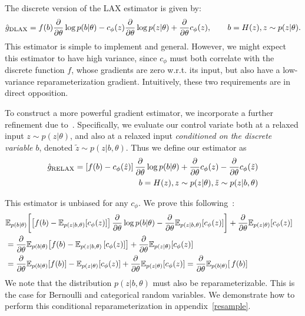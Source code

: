 \documentclass{article}
\newcommand{\discreteDist}{p(b|\theta)}
\newcommand{\loss}{f(b)}
\newcommand{\expectedLoss}{\mathbb{E}_{\discreteDist{}} \! \left[ \, \loss{} \right]}
\newcommand{\E}{\mathbb{E}}
\newcommand{\PT}{\frac{\partial}{\partial \theta}}
\newcommand{\LAX}{{\textnormal{LAX}}}
\newcommand{\DLAX}{{\textnormal{DLAX}}}
\begin{document}
The discrete version of the \LAX{} estimator is given by:
%
\begin{align}
\label{eq:discrete lax}
\hat g_\DLAX = f(b) \PT \log p(b|\theta) - c_\phi(z) \PT \log p(z|\theta) + \PT c_\phi(z), \qquad b = H(z), z \sim p(z|\theta).
\end{align}
%
This estimator is simple to implement and general.
However, we might expect this estimator to have high variance, since $c_\phi$ must both correlate with the discrete function $f$, whose gradients are zero w.r.t. its input, but also have a low-variance reparameterization gradient.
Intuitively, these two requirements are in direct opposition.

To construct a more powerful gradient estimator, we incorporate a further refinement due to~\cite{tucker2017rebar}.
Specifically, we evaluate our control variate both at a relaxed input $z \sim p(z|\theta)$, and also at a relaxed input \emph{conditioned on the discrete variable $b$}, denoted $\tilde z \sim p(z|b, \theta)$. 
Thus we define our estimator as
%
\begin{align}
\hat g_\textnormal{RELAX} = \left[ f(b) - c_\phi(\hat{z}) \right] \PT \log p(b|\theta) + \PT c_\phi(z) - \PT c_\phi (\tilde{z}) \\
\qquad b = H(z), z \sim p(z|\theta), \tilde{z} \sim p(z|b, \theta) \nonumber
\end{align}
%

This estimator is unbiased for any $c_\phi$.
We prove this following~\cite{tucker2017rebar}:
%
\begin{align}
\E_{p(b|\theta)} \! \left[\left[ f(b) - \E_{p(z|b, \theta)} \! \left[c_\phi(z) \right] \right]\PT \log p(b|\theta)  - \PT \E_{p(z|b, \theta)} \! \left[c_\phi(z) \right] \right] + \PT\E_{p(z|\theta)} \! \left[ c_\phi(z) \right] \span & \nonumber\\
&= \PT \E_{p(b|\theta)} \! \left[ f(b) - \E_{p(z|b, \theta)}\left[ c_\phi(z) \right]  \right] + \PT\E_{p(z|\theta)} \! \left[ c_\phi(z) \right]\nonumber\\
&= \PT \E_{p(b|\theta)} \! \left[ f(b) \right] - \E_{p(z|\theta)} \! \left[ c_\phi(z) \right] + \PT\E_{p(z|\theta)} \! \left[ c_\phi(z) \right]
= \PT \expectedLoss{}%
\end{align}
%
We note that the distribution $p(z|b,\theta)$ must also be reparameterizable.
This is the case for Bernoulli and categorical random variables.
We demonstrate how to perform this conditional reparameterization in appendix~\ref{resample}.
\end{document}
